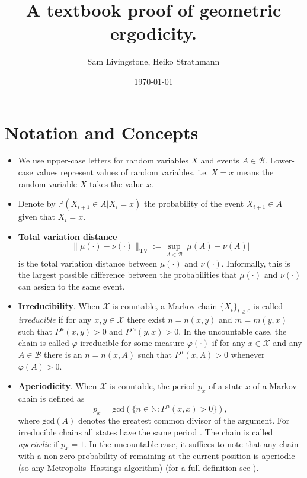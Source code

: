\documentclass{article}
\title{\Large \bfseries A textbook proof of geometric ergodicity.}
\author{Sam Livingstone, Heiko Strathmann}
\date{\today}
\newcommand{\ch}[1]{ \{#1_t\}_{t \geq 0} }
\newcommand{\X}{\mathcal{X}}
\newcommand{\B}{\mathcal{B}}
\newcommand{\TV}{\text{TV}}
\begin{document}
\maketitle

\listoftodos

\section{Notation and Concepts}

\begin{itemize}
\item We use upper-case letters for random variables $X$ and events $A\in \mathcal{B}$. Lower-case values represent values of random variables, i.e. $X=x$ means the random variable $X$ takes the value $x$.
\item Denote by $\mathbb{P}(X_{i+1} \in A |X_i = x)$ the probability of the event $X_{i+1} \in A$ given that $X_i = x$.
\item \textbf{Total variation distance}
\begin{equation*}
\|\mu(\cdot) - \nu(\cdot)\|_{\TV} := \sup_{A \in \mathcal{B}} |\mu(A) - \nu(A)|
\end{equation*}
is the total variation distance between $\mu(\cdot)$ and $\nu(\cdot)$. Informally, this is the largest possible difference between the probabilities that $\mu(\cdot)$ and $\nu(\cdot)$ can assign to the same event.
\item \textbf{Irreducibility}. When $\X$ is countable, a Markov chain $\ch{X}$ is called \emph{irreducible} if for any $x,y \in \X$ there exist $n = n(x,y)$ and $m = m(y,x)$ such that $P^n(x,y)>0$ and $P^m(y,x) > 0$.  In the uncountable case, the chain is called $\varphi$-irreducible for some measure $\varphi(\cdot)$ if for any $x \in \X$ and any $A \in \B$ there is an $n = n(x,A)$ such that $P^n(x,A) > 0$ whenever $\varphi(A) > 0$.
\item \textbf{Aperiodicity}. When $\X$ is countable, the period $p_x$ of a state $x$ of a Markov chain is defined as
\[
p_x = \text{gcd}(\{ n \in \mathbb{N} : P^n(x,x) > 0 \}),
\]
where $\text{gcd}(A)$ denotes the greatest common divisor of the argument.  For irreducible chains all states have the same period \cite{}.  The chain is called \emph{aperiodic} if $p_x = 1$.  In the uncountable case, it suffices to note that any chain with a non-zero probability of remaining at the current position is aperiodic (so any Metropolis--Hastings algorithm) (for a full definition see \cite{}).

\end{itemize}
\end{document}
